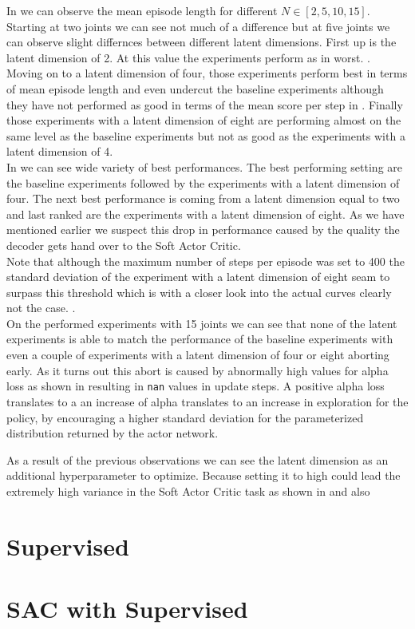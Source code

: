 In  we can observe the mean episode length for different $N \in [2, 5, 10, 15]$. Starting at two joints we can see not much of a difference but at five joints we can observe slight differnces between different latent dimensions. First up is the latent dimension of 2. At this value the experiments perform as in  worst. .\\
Moving on to a latent dimension of four, those experiments perform best in terms of mean episode length and even undercut the baseline experiments although they have not performed as good in terms of the mean score per step in . Finally those experiments with a latent dimension of eight are performing almost on the same level as the baseline experiments but not as good as the experiments with a latent dimension of 4. \\
In  we can see wide variety of best performances. The best performing setting are the baseline experiments followed by the experiments with a latent dimension of four. The next best performance is coming from a latent dimension equal to two and last ranked are the experiments with a latent dimension of eight. As we have mentioned earlier we suspect this drop in performance caused by the quality the decoder gets hand over to the Soft Actor Critic. \\
Note that although the maximum number of steps per episode was set to 400 the standard deviation of the experiment with a latent dimension of eight seam to surpass this threshold which is with a closer look into the actual curves clearly not the case. . \\ 
On the performed experiments with 15 joints we can see that none of the latent experiments is able to match the performance of the baseline experiments with even a couple of experiments with a latent dimension of four or eight aborting early. As it turns out this abort is caused by abnormally high values for alpha loss as shown in  resulting in \texttt{nan} values in update steps. A positive alpha loss translates to a an increase of alpha translates to an increase in exploration for the policy, by encouraging a higher standard deviation for the parameterized distribution returned by the actor network. 

As a result of the previous observations we can see the latent dimension as an additional hyperparameter to optimize. Because setting it to high could lead the extremely high variance in the Soft Actor Critic task as shown in  and also


\section{Supervised}


\section{SAC with Supervised}